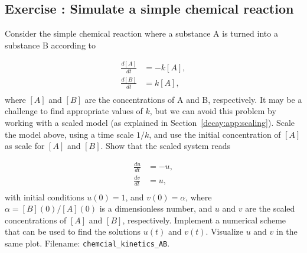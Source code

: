 \documentclass[%
oneside,                 %
final,                   %
10pt]{article}
\newenvironment{doconceexercise}{}{}
\newcounter{doconceexercisecounter}
\begin{document}
\begin{doconceexercise}

\subsection*{Exercise \thedoconceexercisecounter: Simulate a simple chemical reaction}

\label{decay:app:exer:kinetics:AB}

Consider the simple chemical reaction where a substance A is turned
into a substance B according to

\begin{align*}
\frac{d[A]}{dt} &= -k[A],\\ 
\frac{d[B]}{dt} &= k[A],\\ 
\end{align*}
where $[A]$ and $[B]$ are the concentrations of A and B, respectively.
It may be a challenge to find appropriate values of $k$, but we can avoid
this problem by working with a scaled model (as explained in
Section~\ref{decay:app:scaling}).
Scale the model above, using a time scale $1/k$, and use
the initial concentration
of $[A]$ as scale for $[A]$ and $[B]$. Show that the scaled system
reads

\begin{align*}
\frac{du}{dt} &= -u,\\ 
\frac{dv}{dt} &= u,\\ 
\end{align*}
with initial conditions $u(0)=1$, and $v(0)=\alpha$, where
$\alpha = [B](0)/[A](0)$ is a dimensionless number, and
$u$ and $v$ are the scaled concentrations of $[A]$ and $[B]$,
respectively. Implement a numerical scheme that can be used to
find the solutions
$u(t)$ and $v(t)$. Visualize $u$ and $v$ in the same plot.
\noindent Filename: \Verb!chemcial_kinetics_AB!.

\end{doconceexercise}
\end{document}
